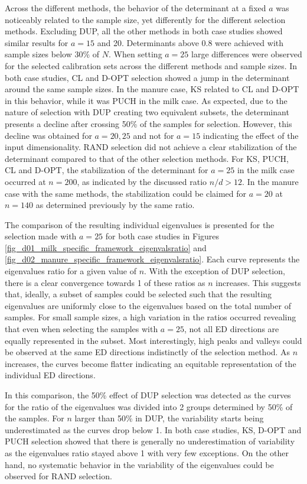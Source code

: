\documentclass[journal=ancham,manuscript=article]{achemso}
\begin{document}
Across the different methods, the behavior of the determinant at a fixed $a$ was noticeably related to the sample size, yet differently for the different selection methods. Excluding DUP, all the other methods in both case studies showed similar results for $a=15$ and 20. Determinants above 0.8 were achieved with sample sizes below 30\% of $N$. When setting $a=25$ large differences were observed for the selected calibration sets across the different methods and sample sizes. In both case studies, CL and D-OPT selection showed a jump in the determinant around the same sample sizes. In the manure case, KS related to CL and D-OPT in this behavior, while it was PUCH in the milk case. As expected, due to the nature of selection with DUP creating two equivalent subsets, the determinant presents a decline after crossing 50\% of the samples for selection. However, this decline was obtained for $a=20, 25$ and not for $a=15$ indicating the effect of the input dimensionality. RAND selection did not achieve a clear stabilization of the determinant compared to that of the other selection methods. For KS, PUCH, CL and D-OPT, the stabilization of the determinant for $a=25$ in the milk case occurred at $n=200$, as indicated by the discussed ratio $n/d>12$. In the manure case with the same methods, the stabilization could be claimed for $a=20$ at $n=140$ as determined previously by the same ratio. 

The comparison of the resulting individual eigenvalues is presented for the selection made with $a = 25$ for both case studies in Figures \ref{fig_d01_milk_specific_framework_eigenvalsratio} and \ref{fig_d02_manure_specific_framework_eigenvalsratio}. Each curve represents the eigenvalues ratio for a given value of $n$. With the exception of DUP selection, there is a clear convergence towards 1 of these ratios as $n$ increases. This suggests that, ideally, a subset of samples could be selected such that the resulting eigenvalues are uniformly close to the eigenvalues based on the total number of samples. For small sample sizes, a high variation in the ratios occurred revealing that even when selecting the samples with $a=25$, not all ED directions are equally represented in the subset. Most interestingly, high peaks and valleys could be observed at the same ED directions indistinctly of the selection method. As $n$ increases, the curves become flatter indicating an equitable representation of the individual ED directions. 

In this comparison, the 50\% effect of DUP selection was detected as the curves for the ratio of the eigenvalues was divided into 2 groups determined by 50\% of the samples. For $n$ larger than 50\% in DUP, the variability starts being underestimated as the curves drop below 1. In both case studies, KS, D-OPT and PUCH selection showed that there is generally no underestimation of variability as the eigenvalues ratio stayed above 1 with very few exceptions. On the other hand, no systematic behavior in the variability of the eigenvalues could be observed for RAND selection. 
\end{document}
